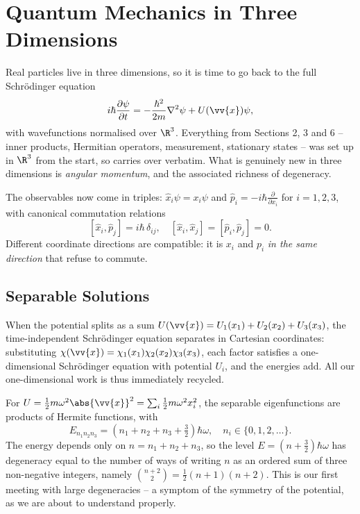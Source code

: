 \section{Quantum Mechanics in Three Dimensions}

Real particles live in three dimensions, so it is time to go back to the full Schr\"odinger equation
$$
i \hbar \frac{\partial \psi}{\partial t} = -\frac{\hbar^2}{2m} \nabla^2 \psi + U(\vv{x}) \psi,
$$
with wavefunctions normalised over $\R^3$. Everything from Sections 2, 3 and 6 -- inner products, Hermitian operators, measurement, stationary states -- was set up in $\R^3$ from the start, so carries over verbatim. What is genuinely new in three dimensions is \emph{angular momentum}, and the associated richness of degeneracy.

The observables now come in triples: $\hat{x}_i \psi = x_i \psi$ and $\hat{p}_i = -i\hbar \frac{\partial}{\partial x_i}$ for $i = 1, 2, 3$, with canonical commutation relations
$$
[\hat{x}_i, \hat{p}_j] = i \hbar \, \delta_{ij}, \quad [\hat{x}_i, \hat{x}_j] = [\hat{p}_i, \hat{p}_j] = 0.
$$
Different coordinate directions are compatible: it is $x_i$ and $p_i$ \emph{in the same direction} that refuse to commute.

\subsection{Separable Solutions}

When the potential splits as a sum $U(\vv{x}) = U_1(x_1) + U_2(x_2) + U_3(x_3)$, the time-independent Schr\"odinger equation separates in Cartesian coordinates: substituting $\chi(\vv{x}) = \chi_1(x_1)\chi_2(x_2)\chi_3(x_3)$, each factor satisfies a one-dimensional Schr\"odinger equation with potential $U_i$, and the energies add. All our one-dimensional work is thus immediately recycled.

\begin{example}
    For $U = \frac{1}{2} m \omega^2 \abs{\vv{x}}^2 = \sum_i \frac{1}{2}m\omega^2 x_i^2$, the separable eigenfunctions are products of Hermite functions, with
    $$
    E_{n_1 n_2 n_3} = \left( n_1 + n_2 + n_3 + \tfrac{3}{2} \right) \hbar \omega, \quad n_i \in \{0, 1, 2, \dots\}.
    $$
    The energy depends only on $n = n_1 + n_2 + n_3$, so the level $E = (n + \frac{3}{2})\hbar\omega$ has degeneracy equal to the number of ways of writing $n$ as an ordered sum of three non-negative integers, namely $\binom{n+2}{2} = \frac{1}{2}(n+1)(n+2)$. This is our first meeting with large degeneracies -- a symptom of the symmetry of the potential, as we are about to understand properly.
\end{example}

